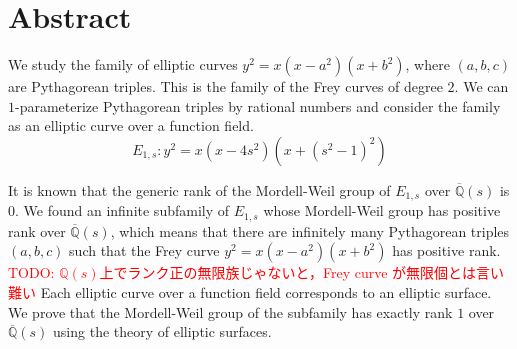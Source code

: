 \documentclass[main]{subfiles}
\begin{document}
\chapter{Abstract}
We study the family of elliptic curves $y^2 = x (x - a^2)(x+b^2)$, where $(a,b,c)$ are Pythagorean triples.
This is the family of the Frey curves of degree $2$.
We can $1$-parameterize Pythagorean triples by rational numbers and consider the family as an elliptic curve over a function field.
\begin{equation}
    E_{1,s}: y^{2} = x(x - 4s^{2})(x + (s^{2} - 1)^{2})
\end{equation}

It is known that the generic rank of the Mordell-Weil group of $E_{1,s}$ over $\overline{\mathbb{Q}}(s)$ is $0$.
We found an infinite subfamily of $E_{1,s}$ whose Mordell-Weil group has positive rank over $\overline{\mathbb{Q}}(s)$, which means that there are infinitely many Pythagorean triples $(a,b,c)$ such that the Frey curve $y^2 = x (x - a^2)(x+b^2)$ has positive rank.
\textcolor{red}{TODO: $\mathbb{Q}(s)$上でランク正の無限族じゃないと，Frey curve が無限個とは言い難い}
Each elliptic curve over a function field corresponds to an elliptic surface.
We prove that the Mordell-Weil group of the subfamily has exactly rank $1$ over $\overline{\mathbb{Q}}(s)$ using the theory of elliptic surfaces.
\end{document}
